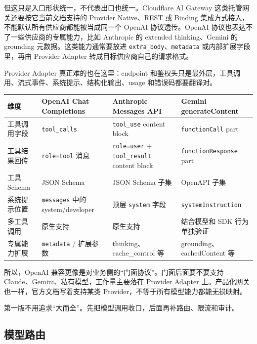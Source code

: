 \documentclass[9pt,a4paper,twocolumn]{ctexart}
\begin{document}
但这只是入口形状统一，不代表出口也统一。Cloudflare AI Gateway 这类托管网关还要按它当前文档支持的 Provider Native、REST 或 Binding 集成方式接入，不能默认所有供应商都能被当成同一个 OpenAI 协议透传。OpenAI 协议也表达不了一些供应商的专属能力，比如 Anthropic 的 extended thinking、Gemini 的 grounding 元数据。这类能力通常要放进 \texttt{extra\_body}、\texttt{metadata} 或内部扩展字段里，再由 Provider Adapter 转成目标供应商自己的请求格式。



Provider Adapter 真正难的也在这里：endpoint 和鉴权头只是最外层，工具调用、流式事件、系统提示、结构化输出、usage 和错误码都要翻译对。


{\footnotesize
\begin{tabular}{|p{}|p{}|p{}|p{}|}
\hline
\textbf{维度} & \textbf{OpenAI Chat Completions} & \textbf{Anthropic Messages API} & \textbf{Gemini generateContent} \\
\hline
工具调用字段 & \texttt{tool\_calls} & \texttt{tool\_use} content block & \texttt{functionCall} part \\
\hline
工具结果回传 & \texttt{role=tool} 消息 & \texttt{role=user} + \texttt{tool\_result} content block & \texttt{functionResponse} part \\
\hline
工具 Schema & JSON Schema & JSON Schema 子集 & OpenAPI 子集 \\
\hline
系统提示位置 & \texttt{messages} 中的 system/developer & 顶层 \texttt{system} 字段 & \texttt{systemInstruction} \\
\hline
多工具调用 & 原生支持 & 原生支持 & 结合模型和 SDK 行为单独验证 \\
\hline
专属能力扩展 & \texttt{metadata} / 扩展参数 & thinking、cache\_control 等 & grounding、cachedContent 等 \\
\hline
\end{tabular}
}



所以，OpenAI 兼容更像是对业务侧的“门面协议”。门面后面要不要支持 Claude、Gemini、私有模型，工作量主要落在 Provider Adapter 上。产品化网关也一样，官方文档写着支持某类 Provider，不等于所有模型能力都能无损映射。



第一版不用追求“大而全”。先把模型调用收口，后面再补路由、限流和审计。



\subsection*{模型路由}
\end{document}
